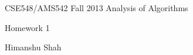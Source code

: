 \documentclass[letterpaper,portrait,12pt]{article}
\begin{document}
\setlength{\oddsidemargin}{0.6250in-1in}

\begin{center}

\end{center}


\begin{center}

\end{center}


\begin{center}

\end{center}


\begin{center}

\end{center}


\begin{center}

\end{center}


\begin{center}

\end{center}


\begin{center}

\end{center}


\begin{center}

\end{center}


\begin{center}

\end{center}


\begin{center}

\end{center}


\begin{center}
{\huge CSE548/AMS542 Fall 2013 Analysis of Algorithms}
\end{center}


\begin{center}

\end{center}


\begin{center}
{\huge Homework 1}
\end{center}


\begin{center}
{\huge Himanshu Shah}
\end{center}
\end{document}
